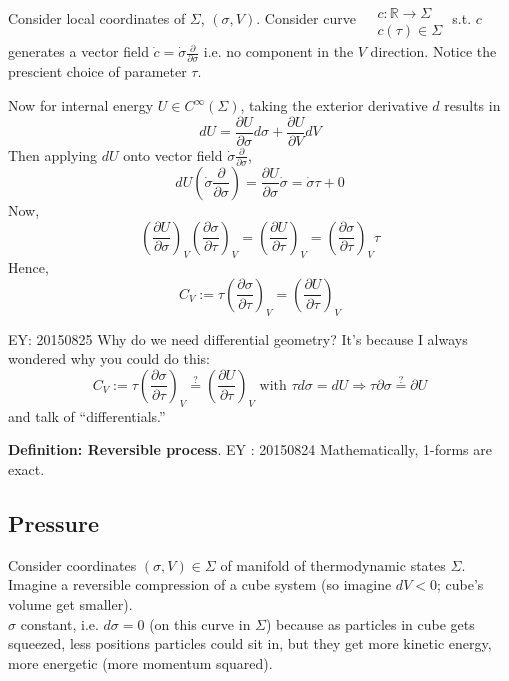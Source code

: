 \documentclass[twoside]{amsart}
\theoremstyle{plain}
\theoremstyle{definition}
\begin{document}
Consider local coordinates of $\Sigma$, $(\sigma,V)$.  Consider curve $\begin{aligned} & \quad \\ 
  & c : \mathbb{R} \to \Sigma \\
  & c(\tau) \in \Sigma \end{aligned}$ s.t. $c$ generates a vector field $\dot{c} = \dot{\sigma} \frac{ \partial }{ \partial \sigma}$ i.e. no component in the $V$ direction.  Notice the prescient choice of parameter $\tau$.  

Now for internal energy $U \in C^{\infty}(\Sigma)$, taking the exterior derivative $d$ results in 
\[
dU = \frac{ \partial U}{ \partial \sigma} d\sigma + \frac{ \partial U}{ \partial V} dV
\]
Then applying $dU$ onto vector field $\dot{\sigma}\frac{\partial}{\partial \sigma}$,
\[
dU\left(\dot{\sigma} \frac{\partial }{ \partial \sigma} \right) = \frac{ \partial U}{ \partial \sigma} \dot{\sigma} = \dot{\sigma} \tau + 0 
\]
Now,
\[
\left( \frac{ \partial U}{ \partial \sigma} \right)_V \left( \frac{ \partial \sigma }{ \partial \tau} \right)_V = \left( \frac{ \partial U}{ \partial \tau} \right)_V = \left( \frac{ \partial \sigma }{ \partial \tau} \right)_V \tau
\]
Hence, 
\begin{equation}
C_V := \tau \left( \frac{ \partial \sigma }{ \partial \tau } \right)_V = \left( \frac{ \partial U}{ \partial \tau} \right)_V
\end{equation}

EY: 20150825 Why do we need differential geometry? It's because I always wondered why you could do this:
\[
C_V := \tau \left( \frac{ \partial \sigma }{ \partial \tau} \right)_V \overset{?}{=} \left( \frac{ \partial U}{ \partial \tau} \right)_V \text{ with } \tau d\sigma = dU \Longrightarrow \tau \partial \sigma \overset{?}{=} \partial U
\]
and talk of ``differentials.''  

\textbf{Definition: Reversible process}.  EY : 20150824 Mathematically, 1-forms are exact.

\subsection*{Pressure}

Consider coordinates $(\sigma,V)\in \Sigma$ of manifold of thermodynamic states $\Sigma$.  \\
Imagine a reversible compression of a cube system (so imagine $dV<0$; cube's volume get smaller).  \\
$\sigma$ constant, i.e. $d\sigma =0$ (on this curve in $\Sigma$) because as particles in cube gets squeezed, less positions particles could sit in, but they get more kinetic energy, more energetic (more momentum squared).  
\end{document}
